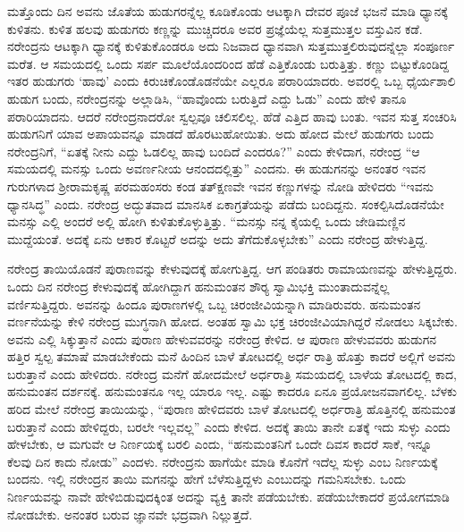 ಮತ್ತೊಂದು ದಿನ ಅವನು ಜೊತೆಯ ಹುಡುಗರನ್ನೆಲ್ಲ ಕೂಡಿಕೊಂಡು ಆಟಕ್ಕಾಗಿ ದೇವರ ಪೂಜೆ ಭಜನೆ ಮಾಡಿ ಧ್ಯಾನಕ್ಕೆ ಕುಳಿತನು. ಕುಳಿತ ಹಲವು ಹುಡುಗರು ಕಣ್ಣನ್ನು ಮುಚ್ಚಿದರೂ ಅವರ ಪ್ರಜ್ಞೆಯೆಲ್ಲ ಸುತ್ತಮುತ್ತಲ ವಸ್ತುವಿನ ಕಡೆ. ನರೇಂದ್ರನು ಆಟಕ್ಕಾಗಿ ಧ್ಯಾನಕ್ಕೆ ಕುಳಿತುಕೊಂಡರೂ ಅದು ನಿಜವಾದ ಧ್ಯಾನವಾಗಿ ಸುತ್ತಮುತ್ತಲಿರುವುದನ್ನೆಲ್ಲಾ ಸಂಪೂರ್ಣ ಮರೆತ. ಆ ಸಮಯದಲ್ಲಿ ಒಂದು ಸರ್ಪ ಮೂಲೆಯೊಂದರಿಂದ ಹೆಡೆ ಎತ್ತಿಕೊಂಡು ಬರುತ್ತಿತ್ತು. ಕಣ್ಣು ಬಿಟ್ಟುಕೊಂಡಿದ್ದ ಇತರ ಹುಡುಗರು ‘ಹಾವು’ ಎಂದು ಕಿರುಚಿಕೊಂಡೊಡನೆಯೇ ಎಲ್ಲರೂ ಪರಾರಿಯಾದರು. ಅವರಲ್ಲಿ ಒಬ್ಬ ಧೈರ್ಯಶಾಲಿ ಹುಡುಗ ಬಂದು, ನರೇಂದ್ರನನ್ನು ಅಲ್ಲಾಡಿಸಿ, “ಹಾವೊಂದು ಬರುತ್ತಿದೆ ಎದ್ದು ಓಡು” ಎಂದು ಹೇಳಿ ತಾನೂ ಪರಾರಿಯಾದನು. ಆದರೆ ನರೇಂದ್ರನಾದರೋ ಸ್ವಲ್ಪವೂ ಚಲಿಸಲಿಲ್ಲ. ಹೆಡೆ ಎತ್ತಿದ ಹಾವು ಬಂತು. ಇವನ ಸುತ್ತ ಸಂಚರಿಸಿ ಹುಡುಗನಿಗೆ ಯಾವ ಅಪಾಯವನ್ನೂ ಮಾಡದೆ ಹೊರಟುಹೋಯಿತು. ಅದು ಹೋದ ಮೇಲೆ ಹುಡುಗರು ಬಂದು ನರೇಂದ್ರನಿಗೆ, “ಏತಕ್ಕೆ ನೀನು ಎದ್ದು ಓಡಲಿಲ್ಲ ಹಾವು ಬಂದಿದೆ ಎಂದರೂ?” ಎಂದು ಕೇಳಿದಾಗ, ನರೇಂದ್ರ “ಆ ಸಮಯದಲ್ಲಿ ಮನಸ್ಸು ಒಂದು ಅವರ್ಣನೀಯ ಆನಂದದಲ್ಲಿತ್ತು” ಎಂದನು. ಈ ಹುಡುಗನನ್ನು ಅನಂತರ ಇವನ ಗುರುಗಳಾದ ಶ‍್ರೀರಾಮಕೃಷ್ಣ ಪರಮಹಂಸರು ಕಂಡ ತತ್‍ಕ್ಷಣವೇ ಇವನ ಕಣ್ಣುಗಳನ್ನು ನೋಡಿ ಹೇಳಿದರು “ಇವನು ಧ್ಯಾನಸಿದ್ಧ” ಎಂದು. ನರೇಂದ್ರ ಅದ್ಭುತವಾದ ಮಾನಸಿಕ ಏಕಾಗ್ರತೆಯನ್ನು ಪಡೆದು ಬಂದಿದ್ದನು. ಸಂಕಲ್ಪಿಸಿದೊಡನೆಯೇ ಮನಸ್ಸು ಎಲ್ಲಿ ಅಂದರೆ ಅಲ್ಲಿ ಹೋಗಿ ಕುಳಿತುಕೊಳ್ಳುತ್ತಿತ್ತು. “ಮನಸ್ಸು ನನ್ನ ಕೈಯಲ್ಲಿ ಒಂದು ಜೇಡಿಮಣ್ಣಿನ ಮುದ್ದೆಯಂತೆ. ಅದಕ್ಕೆ ಏನು ಆಕಾರ ಕೊಟ್ಟರೆ ಅದನ್ನು ಅದು ತೆಗೆದುಕೊಳ್ಳಬೇಕು” ಎಂದು ನರೇಂದ್ರ ಹೇಳುತ್ತಿದ್ದ. 

ನರೇಂದ್ರ ತಾಯಿಯೊಡನೆ ಪುರಾಣವನ್ನು ಕೇಳುವುದಕ್ಕೆ ಹೋಗುತ್ತಿದ್ದ. ಆಗ ಪಂಡಿತರು ರಾಮಾಯಣವನ್ನು ಹೇಳುತ್ತಿದ್ದರು. ಒಂದು ದಿನ ನರೇಂದ್ರ ಕೇಳುವುದಕ್ಕೆ ಹೋಗಿದ್ದಾಗ ಹನುಮಂತನ ಶೌರ‍್ಯ ಸ್ವಾಮಿಭಕ್ತಿ ಮುಂತಾದುವನ್ನೆಲ್ಲ ವರ್ಣಿಸುತ್ತಿದ್ದರು. ಅವನನ್ನು ಹಿಂದೂ ಪುರಾಣಗಳಲ್ಲಿ ಒಬ್ಬ ಚಿರಂಜೀವಿಯನ್ನಾಗಿ ಮಾಡಿರುವರು. ಹನುಮಂತನ ವರ್ಣನೆಯನ್ನು ಕೇಳಿ ನರೇಂದ್ರ ಮುಗ್ಧನಾಗಿ ಹೋದ. ಅಂತಹ ಸ್ವಾಮಿ ಭಕ್ತ ಚಿರಂಜೀವಿಯಾಗಿದ್ದರೆ ನೋಡಲು ಸಿಕ್ಕಬೇಕು. ಅವನು ಎಲ್ಲಿ ಸಿಕ್ಕುತ್ತಾನೆ ಎಂದು ಪುರಾಣ ಹೇಳುವವರನ್ನು ನರೇಂದ್ರ ಕೇಳಿದ. ಆ ಪುರಾಣ ಹೇಳುವವರು ಹುಡುಗನ ಹತ್ತಿರ ಸ್ವಲ್ಪ ತಮಾಷೆ ಮಾಡಬೇಕೆಂದು ಮನೆ ಹಿಂದಿನ ಬಾಳೆ ತೋಟದಲ್ಲಿ ಅರ್ಧ ರಾತ್ರಿ ಹೊತ್ತು ಕಾದರೆ ಅಲ್ಲಿಗೆ ಅವನು ಬರುತ್ತಾನೆ ಎಂದು ಹೇಳಿದರು. ನರೇಂದ್ರ ಮನೆಗೆ ಹೋದಮೇಲೆ ಅರ್ಧರಾತ್ರಿ ಸಮಯದಲ್ಲಿ ಬಾಳೆಯ ತೋಟದಲ್ಲಿ ಕಾದ, ಹನುಮಂತನ ದರ್ಶನಕ್ಕೆ. ಹನುಮಂತನೂ ಇಲ್ಲ ಯಾರೂ ಇಲ್ಲ. ಎಷ್ಟು ಕಾದರೂ ಏನೂ ಪ್ರಯೋಜನವಾಗಲಿಲ್ಲ. ಬೆಳಕು ಹರಿದ ಮೇಲೆ ನರೇಂದ್ರ ತಾಯಿಯನ್ನು, “ಪುರಾಣ ಹೇಳಿದವರು ಬಾಳೆ ತೋಟದಲ್ಲಿ ಅರ್ಧರಾತ್ರಿ ಹೊತ್ತಿನಲ್ಲಿ ಹನುಮಂತ ಬರುತ್ತಾನೆ ಎಂದು ಹೇಳಿದ್ದರು, ಬರಲೇ ಇಲ್ಲವಲ್ಲ” ಎಂದು ಕೇಳಿದ. ಅದಕ್ಕೆ ತಾಯಿ ತಾನೇ ಏತಕ್ಕೆ ಇದು ಸುಳ್ಳು ಎಂದು ಹೇಳಬೇಕು, ಆ ಮಗುವೇ ಆ ನಿರ್ಣಯಕ್ಕೆ ಬರಲಿ ಎಂದು, “ಹನುಮಂತನಿಗೆ ಒಂದೇ ದಿವಸ ಕಾದರೆ ಸಾಕೆ, ಇನ್ನೂ ಕೆಲವು ದಿನ ಕಾದು ನೋಡು” ಎಂದಳು. ನರೇಂದ್ರನು ಹಾಗೆಯೇ ಮಾಡಿ ಕೊನೆಗೆ ಇದೆಲ್ಲ ಸುಳ್ಳು ಎಂಬ ನಿರ್ಣಯಕ್ಕೆ ಬಂದನು. ಇಲ್ಲಿ ನರೇಂದ್ರನ ತಾಯಿ ಮಗನನ್ನು ಹೇಗೆ ಬೆಳೆಸುತ್ತಿದ್ದಳು ಎಂಬುದನ್ನು ಗಮನಿಸಬೇಕು. ಒಂದು ನಿರ್ಣಯವನ್ನು ನಾವೇ ಹೇಳಿಬಿಡುವುದಕ್ಕಿಂತ ಅದನ್ನು ವ್ಯಕ್ತಿ ತಾನೇ ಪಡೆಯಬೇಕು. ಪಡೆಯಬೇಕಾದರೆ ಪ್ರಯೋಗಮಾಡಿ ನೋಡಬೇಕು. ಅನಂತರ ಬರುವ ಜ್ಞಾನವೇ ಭದ್ರವಾಗಿ ನಿಲ್ಲುತ್ತದೆ. 

